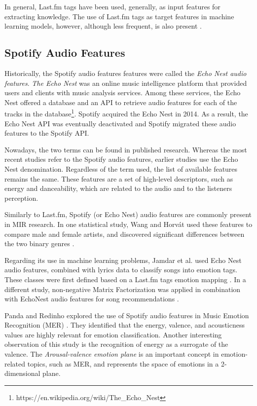 \documentclass[sn-mathphys]{sn-jnl}%
\theoremstyle{thmstyleone}%
\theoremstyle{thmstyletwo}%
\theoremstyle{thmstylethree}%
\begin{document}
In general, Last.fm tags have been used, generally, as input features for extracting knowledge.
The use of Last.fm tags as target features in machine learning models, however, although less frequent, is also present \cite{eck2007autotagging}.

\subsection{Spotify Audio Features}

Historically, the Spotify audio features features were called the \emph{Echo Nest audio features}.
\emph{The Echo Nest} was an online music intelligence platform that provided users and clients with music analysis services.
Among these services, the Echo Nest offered a database and an API to retrieve audio features for each of the tracks in the database\footnote[3]{https://en.wikipedia.org/wiki/The\_Echo\_Nest}.
Spotify acquired the Echo Nest in 2014.
As a result, the Echo Nest API was eventually deactivated and Spotify migrated these audio features to the Spotify API.

Nowadays, the two terms can be found in published research.
Whereas the most recent studies refer to the Spotify audio features,
earlier studies use the Echo Nest denomination.
Regardless of the term used, the list of available features remains the same.
These features are a set of high-level descriptors, such as energy and danceability,
which are related to the audio and to the listeners perception.

Similarly to Last.fm, Spotify (or Echo Nest) audio features are commonly present in MIR research.
In one statistical study, Wang and Horv{\'a}t used these features to compare male and female artists,
and discovered significant differences between the two binary genres \cite{wang2019gender}.

Regarding its use in machine learning problems, Jamdar et al. used Echo Nest audio features, combined with lyrics data to classify songs into emotion tags.
These classes were first defined based on a Last.fm tags emotion mapping \cite{jamdar2015emotion}.
In a different study, non-negative Matrix Factorization was applied in combination with EchoNest audio features
for song recommendations \cite{benzi2016song}.

Panda and Redinho explored the use of Spotify audio features in Music Emotion Recognition (MER) \cite{panda2021does}.
They identified that the energy, valence, and acousticness values are highly relevant for emotion classification.
Another interesting observation of this study is the recognition of energy as a surrogate of the valence.
The \emph{Arousal-valence emotion plane} is an important concept in emotion-related topics, such as MER, and represents the space of emotions in a 2-dimensional plane.
\end{document}

